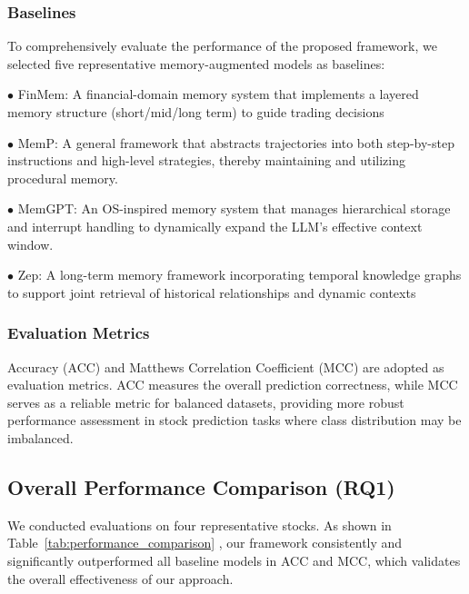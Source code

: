 \documentclass[sigconf, nonacm]{acmart} %
\begin{document}
\subsubsection{Baselines}
To comprehensively evaluate the performance of the proposed framework, we selected five representative memory-augmented models as baselines:

$\bullet$ FinMem\cite{yu2025finmem}: %
A financial-domain memory system that implements a layered memory structure (short/mid/long term) to guide trading decisions

$\bullet$ MemP\cite{fang2025memp}: 
A general framework that abstracts trajectories into both step-by-step instructions and high-level strategies, thereby maintaining and utilizing procedural memory.

$\bullet$ MemGPT\cite{packer2023memgpt}: 
An OS-inspired memory system that manages hierarchical storage and interrupt handling to dynamically expand the LLM's effective context window.

$\bullet$ Zep\cite{rasmussen2025zep}: 
A long-term memory framework incorporating temporal knowledge graphs to support joint retrieval of historical relationships and dynamic contexts
\subsubsection{Evaluation Metrics}
Accuracy (ACC) and Matthews Correlation Coefficient (MCC) are adopted as evaluation metrics. ACC measures the overall prediction correctness, while MCC serves as a reliable metric for balanced datasets, providing more robust performance assessment in stock prediction tasks where class distribution may be imbalanced.

\subsection{Overall Performance Comparison (RQ1)}
We conducted evaluations on four representative stocks. As shown in Table~\ref{tab:performance_comparison} , our framework consistently and significantly outperformed all baseline models in ACC and MCC,
which validates the overall effectiveness of our approach.
\end{document}
